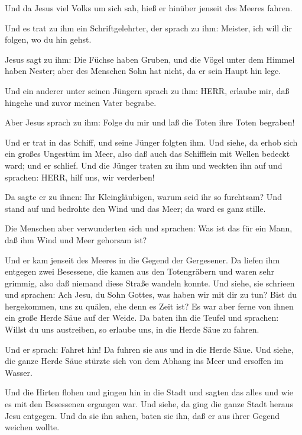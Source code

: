  Und da Jesus viel Volks um sich sah, hieß er hinüber
jenseit des Meeres fahren.

 Und es trat zu ihm ein Schriftgelehrter, der sprach zu
ihm: Meister, ich will dir folgen, wo du hin gehst.

 Jesus sagt zu ihm: Die Füchse haben Gruben, und die Vögel
unter dem Himmel haben Nester; aber des Menschen Sohn hat nicht, da er
sein Haupt hin lege.

 Und ein anderer unter seinen Jüngern sprach zu ihm: HERR,
erlaube mir, daß hingehe und zuvor meinen Vater begrabe.

 Aber Jesus sprach zu ihm: Folge du mir und laß die Toten
ihre Toten begraben!

 Und er trat in das Schiff, und seine Jünger folgten ihm.
 Und siehe, da erhob sich ein großes Ungestüm im Meer, also
daß auch das Schifflein mit Wellen bedeckt ward; und er schlief.
 Und die Jünger traten zu ihm und weckten ihn auf und
sprachen: HERR, hilf uns, wir verderben!

 Da sagte er zu ihnen: Ihr Kleingläubigen, warum seid ihr
so furchtsam? Und stand auf und bedrohte den Wind und das Meer; da ward
es ganz stille.

 Die Menschen aber verwunderten sich und sprachen: Was ist
das für ein Mann, daß ihm Wind und Meer gehorsam ist?

 Und er kam jenseit des Meeres in die Gegend der
Gergesener. Da liefen ihm entgegen zwei Besessene, die kamen aus den
Totengräbern und waren sehr grimmig, also daß niemand diese Straße
wandeln konnte.  Und siehe, sie schrieen und sprachen: Ach
Jesu, du Sohn Gottes, was haben wir mit dir zu tun? Bist du hergekommen,
uns zu quälen, ehe denn es Zeit ist?  Es war aber ferne von
ihnen ein große Herde Säue auf der Weide.  Da baten ihn die
Teufel und sprachen: Willst du uns austreiben, so erlaube uns, in die
Herde Säue zu fahren.

 Und er sprach: Fahret hin! Da fuhren sie aus und in die
Herde Säue. Und siehe, die ganze Herde Säue stürzte sich von dem Abhang
ins Meer und ersoffen im Wasser.

 Und die Hirten flohen und gingen hin in die Stadt und
sagten das alles und wie es mit den Besessenen ergangen war.
 Und siehe, da ging die ganze Stadt heraus Jesu entgegen.
Und da sie ihn sahen, baten sie ihn, daß er aus ihrer Gegend weichen
wollte.

